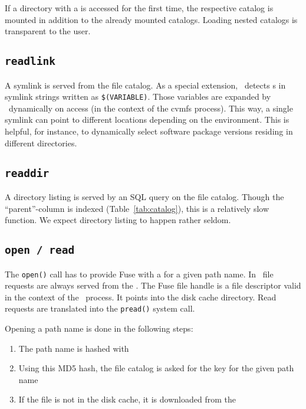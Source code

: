 If a directory with a  is accessed for the first time, the respective catalog is mounted in addition to the already mounted catalogs.
Loading nested catalogs is transparent to the user.

\subsection{\tt readlink}
A symlink is served from the file catalog.
As a special extension, \cvmfs\ detects s in symlink strings written as \texttt{\$(VARIABLE)}.
Those variables are expanded by \cvmfs\ dynamically on access (in the context of the cvmfs process).
This way, a single symlink can point to different locations depending on the environment.
This is helpful, for instance, to dynamically select software package versions residing in different directories.

\subsection{\tt readdir}
A directory listing is served by an SQL query on the file catalog.
Though the ``parent''-column is indexed (\cf Table~\ref{tab:catalog}), this is a relatively slow function.
We expect directory listing to happen rather seldom.

\subsection{\tt open / read}
The \texttt{open()} call has to provide Fuse with a  for a given path name.
In \cvmfs\ file requests are always served from the .
The Fuse file handle is a file descriptor valid in the context of the \cvmfs\ process.
It points into the disk cache directory.
Read requests are translated into the \texttt{pread()} system call.

Opening a path name is done in the following steps:
\begin{enumerate}
	\item The path name is hashed with 
	\item Using this MD5 hash, the file catalog is asked for the  key for the given path name
	\item If the file is not in the disk cache, it is downloaded from the 
\end{enumerate}


